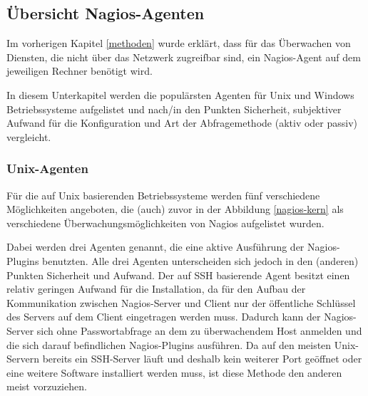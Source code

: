 \subsection{Übersicht Nagios-Agenten}
Im vorherigen Kapitel \ref{methoden} wurde erklärt, dass für das Überwachen von Diensten, die nicht über das Netzwerk zugreifbar sind, ein Nagios-Agent auf dem jeweiligen Rechner benötigt wird.

In diesem Unterkapitel werden die populärsten Agenten für Unix und Windows Betriebssysteme aufgelistet und nach/in den Punkten Sicherheit, subjektiver Aufwand für die Konfiguration und Art der Abfragemethode (aktiv oder passiv) vergleicht.

\subsubsection{Unix-Agenten}
Für die auf Unix basierenden Betriebssysteme werden fünf verschiedene Möglichkeiten angeboten, die (auch) zuvor in der Abbildung \ref{nagios-kern} als verschiedene Überwachungsmöglichkeiten von Nagios aufgelistet wurden.



Dabei werden drei Agenten genannt, die eine aktive Ausführung der Nagios-Plugins benutzten.
Alle drei Agenten unterscheiden sich jedoch in den (anderen) Punkten Sicherheit und Aufwand.
Der auf \gls{SSH} basierende Agent besitzt einen relativ geringen Aufwand für die Installation, da für den Aufbau der Kommunikation zwischen Nagios-Server und Client nur der öffentliche Schlüssel des Servers auf dem Client eingetragen werden muss.
Dadurch kann der Nagios-Server sich ohne Passwortabfrage an dem zu überwachendem Host anmelden und die sich darauf befindlichen Nagios-Plugins ausführen.
Da auf den meisten Unix-Servern bereits ein \gls{SSH}-Server läuft und deshalb kein weiterer Port geöffnet oder eine weitere Software installiert werden muss, ist diese Methode den anderen meist vorzuziehen.

